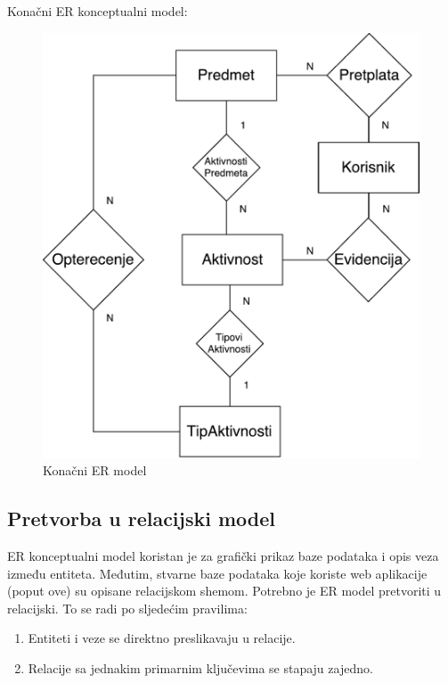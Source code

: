\documentclass[times, utf8, zavrsni]{fer}
\begin{document}
Konačni ER konceptualni model:

\begin{figure}[H]
\centering
\includegraphics[width=\textwidth,height=\textheight,keepaspectratio]{img/er-model.pdf}
\caption{Konačni ER model}
\label{fig:er-model}
\end{figure}
\clearpage

\subsection{Pretvorba u relacijski model}
ER konceptualni model koristan je za grafički prikaz baze podataka i opis veza između entiteta. Međutim, stvarne baze podataka koje koriste web aplikacije (poput ove) su opisane relacijskom shemom. Potrebno je ER model pretvoriti u relacijski. To se radi po sljedećim pravilima:

\begin{enumerate}
\item Entiteti i veze se direktno preslikavaju u relacije.
\item Relacije sa jednakim primarnim ključevima se stapaju zajedno.
\end{enumerate}
\end{document}
